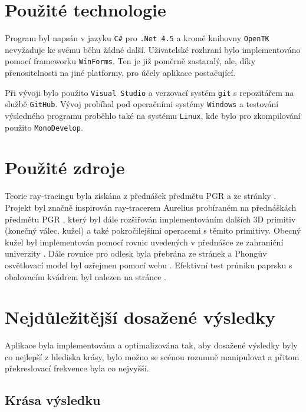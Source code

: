 \documentclass[12pt,a4paper,titlepage,final]{report}
\begin{document}
\chapter{Použité technologie}
Program byl napsán v jazyku \texttt{C\#} pro \texttt{.Net 4.5} a kromě knihovny \texttt{OpenTK} nevyžaduje ke svému běhu žádné další. Uživatelské rozhraní bylo implementováno pomocí frameworku \texttt{WinForms}. Ten je již poměrně zastaralý, ale, díky přenositelnosti na jiné platformy, pro účely aplikace postačující.

Při vývoji bylo použito \texttt{Visual Studio} a verzovací systém \texttt{git} s repozitářem na službě \texttt{GitHub}. Vývoj probíhal pod operačními systémy \texttt{Windows} a testování výsledného programu proběhlo také na systému \texttt{Linux}, kde bylo pro zkompilování použito \texttt{MonoDevelop}.


\begingroup
\let\clearpage\relax
\chapter{Použité zdroje}
Teorie ray-tracingu byla získána z přednášek předmětu PGR a ze stránky \cite{scratchapixel}. Projekt byl značně inspirován ray-tracerem Aurelius probíraném na přednáškách předmětu PGR \cite{aurelius}, který byl dále rozšiřován implementováním dalších 3D primitiv (konečný válec, kužel) a také pokročilejšími operacemi s těmito primitivy. Obecný kužel byl implementován pomocí rovnic uvedených v přednášce ze zahraniční univerzity \cite{cone}. Dále rovnice pro odlesk byla přebrána ze stránek \cite{reflect} a Phongův osvětlovací model byl ozřejmen pomocí webu \cite{phong}. Efektivní test průniku paprsku s obalovacím kvádrem byl nalezen na stránce \cite{aabb}.

\endgroup

\chapter{Nejdůležitější dosažené výsledky}
Aplikace byla implementována a optimalizována tak, aby dosažené výsledky byly co nejlepší z hlediska krásy, bylo možno se scénou rozumně manipulovat a přitom překreslovací frekvence byla co nejvyšší.

\section{Krása výsledku}
\end{document}
